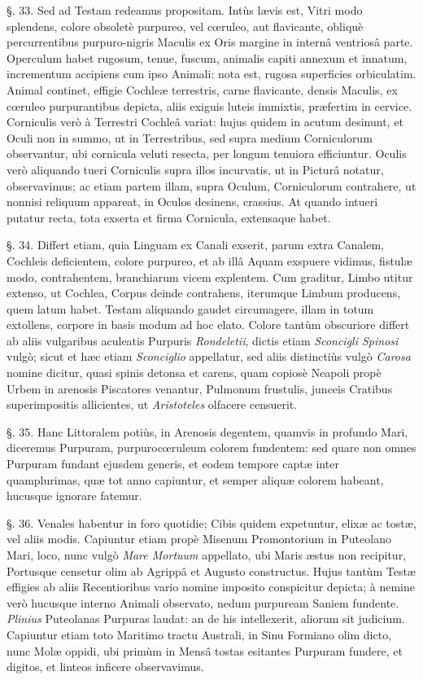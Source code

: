 \documentclass[a4paper, 11pt, oneside, polutonikogreek, german]{article}
\begin{document}
§. 33. Sed ad Testam redeamus propositam. Intùs lævis est, Vitri modo splendens, colore obsoletè purpureo, vel cœruleo, aut flavicante, obliquè percurrentibus purpuro-nigris Maculis ex Oris margine in internâ ventriosâ parte. Operculum habet rugosum, tenue, fuscum, animalis capiti annexum et innatum, incrementum accipiens cum ipso Animali: nota est, rugosa superficies orbiculatim. Animal continet, effigie Cochleæ terrestris, carne flavicante, densis Maculis, ex cœruleo purpurantibus depicta, aliis exiguis luteis immixtis, præfertim in cervice. Corniculis verò à Terrestri Cochleâ variat: hujus quidem in acutum desinunt, et Oculi non in summo, ut in Terrestribus, sed supra medium Corniculorum observantur, ubi cornicula veluti resecta, per longum tenuiora efficiuntur. Oculis verò aliquando tueri Corniculis supra illos incurvatis, ut in Picturâ notatur, observavimus; ac etiam partem illam, supra Oculum, Corniculorum contrahere, ut nonnisi reliquum appareat, in Oculos desinens, crassius. At quando intueri putatur recta, tota exserta et firma Cornicula, extensaque habet.

§. 34. Differt etiam, quia Linguam ex Canali exserit, parum extra Canalem, Cochleis deficientem, colore purpureo, et ab illâ Aquam exspuere vidimus, fistulæ modo, contrahentem, branchiarum vicem explentem. Cum graditur, Limbo utitur extenso, ut Cochlea, Corpus deinde contrahens, iterumque Limbum producens, quem latum habet. Testam aliquando gaudet circumagere, illam in totum extollens, corpore in basis modum ad hoc elato. Colore tantùm obscuriore differt ab aliis vulgaribus aculeatis Purpuris \emph{Rondeletii}, dictis etiam \emph{Sconcigli Spinosi} vulgò; sicut et hæc etiam \emph{Sconciglio} appellatur, sed aliis distinctiùs vulgò \emph{Carosa} nomine dicitur, quasi spinis detonsa et carens, quam copiosè Neapoli propè Urbem in arenosis Piscatores venantur, Pulmonum frustulis, junceis Cratibus superimpositis allicientes, ut \emph{Aristoteles} olfacere censuerit.

§. 35. Hanc Littoralem potiùs, in Arenosis degentem, quamvis in profundo Mari, diceremus Purpuram, purpurocœruleum colorem fundentem: sed quare non omnes Purpuram fundant ejusdem generis, et eodem tempore captæ inter quamplurimas, quæ tot anno capiuntur, et semper aliquæ colorem habeant, hucusque ignorare fatemur.

§. 36. Venales habentur in foro quotidie; Cibis quidem expetuntur, elixæ ac tostæ, vel aliis modis. Capiuntur etiam propè Misenum Promontorium in Puteolano Mari, loco, nunc vulgò \emph{Mare Mortuum} appellato, ubi Maris æstus non recipitur, Portusque censetur olim ab Agrippâ et Augusto constructus. Hujus tantùm Testæ effigies ab aliis Recentioribus vario nomine imposito conspicitur depicta; à nemine verò hucusque interno Animali observato, nedum purpuream Saniem fundente. \emph{Plinius} Puteolanas Purpuras laudat: an de his intellexerit, aliorum sit judicium. Capiuntur etiam toto Maritimo tractu Australi, in Sinu Formiano olim dicto, nunc Molæ oppidi, ubi primùm in Mensâ tostas esitantes Purpuram fundere, et digitos, et linteos inficere observavimus.
\end{document}
